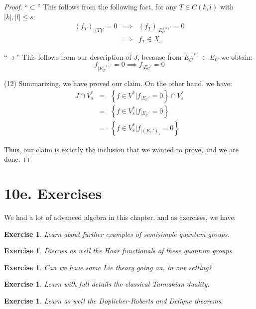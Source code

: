 \documentclass[12pt]{amsbook}
\newtheorem{exercise}[theorem]{Exercise}
\begin{document}
\begin{proof}
\medskip

``$\subset$'' This follows from the following fact, for any $T\in C(k,l)$ with $|k|,|l|\leq s$:
\begin{eqnarray*}
(f_T)_{|\{T\}'}=0
&\implies&(f_T)_{|E_C^{(s)'}}=0\\
&\implies&f_T\in X_s
\end{eqnarray*}

``$\supset$'' This follows from our description of $J$, because from $E_C^{(s)}\subset E_C$ we obtain:
$$f_{|E_C^{(s)'}}=0\implies f_{|E_C'}=0$$

(12) Summarizing, we have proved our claim. On the other hand, we have:
\begin{eqnarray*}
J\cap V_s^*
&=&\left\{f\in V^*\Big|f_{|E_C'}=0\right\}\cap V_s^*\\
&=&\left\{f\in V_s^*\Big|f_{|E_C'}=0\right\}\\
&=&\left\{f\in V_s^*\Big|f_{|(E_C')_s}=0\right\}
\end{eqnarray*}

Thus, our claim is exactly the inclusion that we wanted to prove, and we are done.
\end{proof}

\section*{10e. Exercises}

We had a lot of advanced algebra in this chapter, and as exercises, we have:

\begin{exercise}
Learn about further examples of semisimple quantum groups.
\end{exercise}

\begin{exercise}
Discuss as well the Haar functionals of these quantum groups.
\end{exercise}

\begin{exercise}
Can we have some Lie theory going on, in our setting?
\end{exercise}

\begin{exercise}
Learn with full details the classical Tannakian duality.
\end{exercise}

\begin{exercise}
Learn as well the Doplicher-Roberts and Deligne theorems.
\end{exercise}
\end{document}
